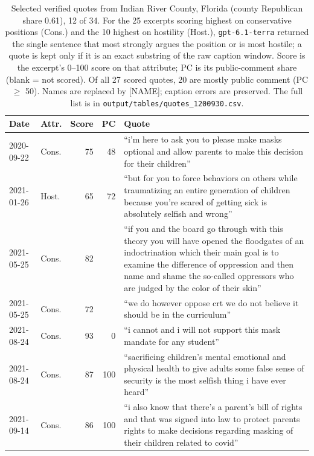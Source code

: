 \begin{table}[H]
\centering
\small
\caption{Selected verified quotes from Indian River County, Florida (county Republican share 0.61), 12 of 34. For the 25 excerpts scoring highest on conservative positions (Cons.) and the 10 highest on hostility (Host.), \texttt{gpt-6.1-terra} returned the single sentence that most strongly argues the position or is most hostile; a quote is kept only if it is an exact substring of the raw caption window. Score is the excerpt's 0--100 score on that attribute; PC is its public-comment share (blank = not scored). Of all 27 scored quotes, 20 are mostly public comment (PC $\geq$ 50). Names are replaced by [NAME]; caption errors are preserved. The full list is in \texttt{output/tables/quotes\_1200930.csv}.}
\label{tab:quotes}
\begin{tabularx}{\linewidth}{@{}l l r r X@{}}
\toprule
Date & Attr. & Score & PC & Quote \\
\midrule
2020-09-22 & Cons. & 75 & 48 & ``i'm here to ask you to please make masks optional and allow parents to make this decision for their children'' \\[2pt]
2021-01-26 & Host. & 65 & 72 & ``but for you to force behaviors on others while traumatizing an entire generation of children because you're scared of getting sick is absolutely selfish and wrong'' \\[2pt]
2021-05-25 & Cons. & 82 &  & ``if you and the board go through with this theory you will have opened the floodgates of an indoctrination which their main goal is to examine the difference of oppression and then name and shame the so-called oppressors who are judged by the color of their skin'' \\[2pt]
2021-05-25 & Cons. & 72 &  & ``we do however oppose crt we do not believe it should be in the curriculum'' \\[2pt]
2021-08-24 & Cons. & 93 & 0 & ``i cannot and i will not support this mask mandate for any student'' \\[2pt]
2021-08-24 & Cons. & 87 & 100 & ``sacrificing children's mental emotional and physical health to give adults some false sense of security is the most selfish thing i have ever heard'' \\[2pt]
2021-09-14 & Cons. & 86 & 100 & ``i also know that there's a parent's bill of rights and that was signed into law to protect parents rights to make decisions regarding masking of their children related to covid'' \\[2pt]

\end{tabularx}
\end{table}
